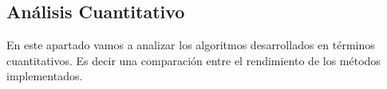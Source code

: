 \subsection{An\'alisis Cuantitativo}
En este apartado vamos a analizar los algoritmos desarrollados en t\'erminos cuantitativos. Es decir una comparaci\'on entre el rendimiento de los m\'etodos implementados.


